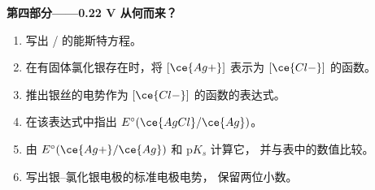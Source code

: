 \begin{problem}
\medskip
\noindent\textbf{第四部分——0.22 V 从何而来？}
\begin{enumerate}[resume]
  \item 写出 / 的能斯特方程。
  \item 在有固体氯化银存在时，将 $[\ce{Ag+}]$ 表示为
        $[\ce{Cl-}]$ 的函数。
  \item 推出银丝的电势作为
        $[\ce{Cl-}]$ 的函数的表达式。
  \item 在该表达式中指出 $E^\circ(\ce{AgCl}/\ce{Ag})$。
  \item 由 $E^\circ(\ce{Ag+}/\ce{Ag})$ 和 $\mathrm{p}K_s$ 计算它，
        并与表中的数值比较。
  \item 写出银–氯化银电极的标准电极电势，
        保留两位小数。
\end{enumerate}
\end{problem}
